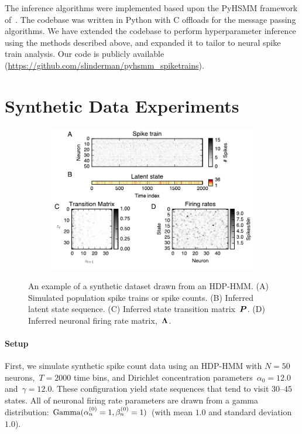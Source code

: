 The inference algorithms were implemented based upon the PyHSMM
framework of~\citep{Johnson14b}. The codebase was written in Python
with C offloads for the message passing algorithms.  We have
extended the codebase to perform hyperparameter inference using the
methods described above, and expanded it to tailor to neural spike
train analysis. Our code is publicly available
({\url{https://github.com/slinderman/pyhsmm_spiketrains}}).

\section{Synthetic Data Experiments}

\begin{figure}[t]
  \centering
  \begin{subfigure}[t]{5.in}
    \includegraphics[width=\textwidth]{figures/ch7/Fig1.pdf}
  \end{subfigure}
  \vspace{-.2in}
  \caption[A synthetic dataset drawn from an HDP-HMM]{ An example of a
    synthetic dataset drawn from an HDP-HMM.  (A) Simulated population
    spike trains or spike counts. (B) Inferred latent state
    sequence. (C) Inferred state transition matrix~$\boldsymbol{P}$. (D) Inferred
    neuronal firing rate matrix,~$\boldsymbol{\Lambda}$.}
\label{fig1}
\end{figure}

\paragraph{Setup} 
 First, we simulate synthetic spike count data using an HDP-HMM with
 ${N=50}$ neurons,~${T=2000}$ time bins, and Dirichlet concentration
 parameters~$\alpha_0=12.0$ and~$\gamma=12.0$. These configuration
 yield state sequences that tend to visit $30$--$45$ states. All of
 neuronal firing rate parameters are drawn from a gamma distribution:
 $\mathrm{Gamma}(\alpha_n^{(0)}=1, \beta_n^{(0)}=1)$ (with mean $1.0$ and standard
 deviation $1.0$).
 
